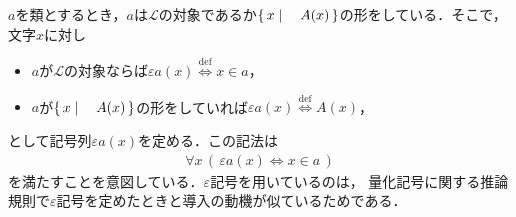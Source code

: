 	
	$a$を類とするとき，$a$は$\mathcal{L}$の対象であるか$\left\{\, x \mid \quad A(x)\, \right\}$の形をしている．そこで，文字$x$に対し
	\begin{itemize}
		\item $a$が$\mathcal{L}$の対象ならば$\varepsilon a(x) \overset{\mathrm{def}}{\Longleftrightarrow} x \in a$，
		\item $a$が$\left\{\, x \mid \quad A(x)\, \right\}$の形をしていれば$\varepsilon a(x) \overset{\mathrm{def}}{\Longleftrightarrow} A(x)$，
	\end{itemize}
	として記号列$\varepsilon a(x)$を定める．この記法は
	\begin{align}
		\forall x\, (\, \varepsilon a(x) \Longleftrightarrow x \in a\, )
		\label{eq:a_meaning_of_epsilon_notation}
	\end{align}
	を満たすことを意図している．$\varepsilon$記号を用いているのは，
	量化記号に関する推論規則で$\varepsilon$記号を定めたときと導入の動機が似ているためである．
	
